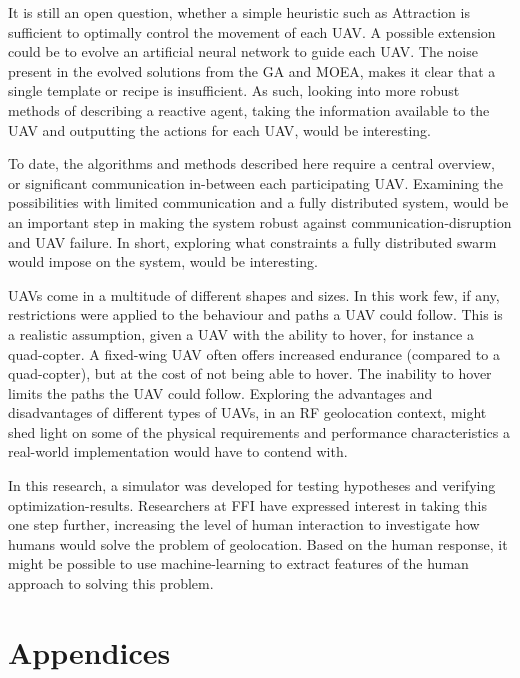 \documentclass[10pt,a4paper]{book}
\begin{document}
It is still an open question, whether a simple heuristic such as Attraction is sufficient to optimally control the movement of each \gls{UAV}. A possible extension could be to evolve an artificial neural network to guide each \gls{UAV}. The noise present in the evolved solutions from the \gls{GA} and \gls{MOEA}, makes it clear that a single template or recipe is insufficient. As such, looking into more robust methods of describing a reactive agent, taking the information available to the \gls{UAV} and outputting the actions for each \gls{UAV}, would be interesting.

To date, the algorithms and methods described here require a central overview, or significant communication in-between each participating \gls{UAV}. Examining the possibilities with limited communication and a fully distributed system, would be an important step in making the system robust against communication-disruption and \gls{UAV} failure. In short, exploring what constraints a fully distributed swarm would impose on the system, would be interesting. 

\glspl{UAV} come in a multitude of different shapes and sizes. In this work few, if any, restrictions were applied to the behaviour and paths a \gls{UAV} could follow. This is a realistic assumption, given a \gls{UAV} with the ability to hover, for instance a quad-copter. A fixed-wing \gls{UAV} often offers increased endurance (compared to a quad-copter), but at the cost of not being able to hover. The inability to hover limits the paths the \gls{UAV} could follow. Exploring the advantages and disadvantages of different types of \glspl{UAV}, in an \gls{RF} geolocation context, might shed light on some of the physical requirements and performance characteristics a real-world implementation would have to contend with.

In this research, a simulator was developed for testing hypotheses and verifying optimization-results. Researchers at \gls{FFI} have expressed interest in taking this one step further, increasing the level of human interaction to investigate how humans would solve the problem of geolocation. Based on the human response, it might be possible to use machine-learning to extract features of the human approach to solving this problem. 



\newpage



\chapter{Appendices}
\end{document}

